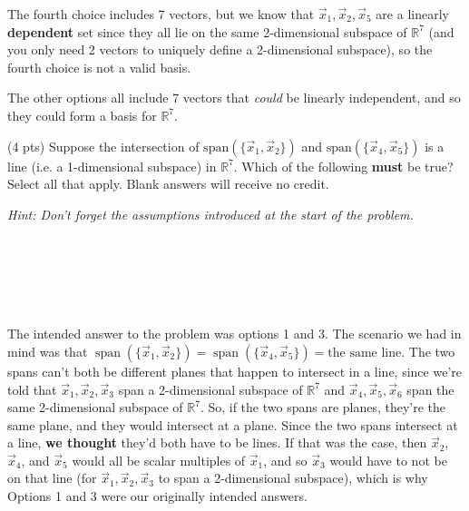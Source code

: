 \documentclass[11pt]{article}
\begin{document}
\begin{prob}
\begin{subprob}
\begin{solution}
The fourth choice includes 7 vectors, but we know that $\vec x_1, \vec x_2, \vec x_5$ are a linearly \textbf{dependent} set since they all lie on the same 2-dimensional subspace of $\mathbb{R}^7$ (and you only need 2 vectors to uniquely define a 2-dimensional subspace), so the fourth choice is not a valid basis.

The other options all include 7 vectors that \textit{could} be linearly independent, and so they could form a basis for $\mathbb{R}^7$.
\end{solution}

\end{subprob}

\begin{subprob}(4 pts) Suppose the intersection of $\text{span}(\{\vec x_1, \vec x_2\})$ and $\text{span}(\{ \vec x_4, \vec x_5 \})$ is a line (i.e. a 1-dimensional subspace) in $\mathbb{R}^{7}$. Which of the following \textbf{must} be true? Select all that apply. Blank answers will receive no credit.

\textit{Hint: Don't forget the assumptions introduced at the start of the problem.} \\ \\
 \\
 \\
 \\
 \\

\begin{solution}
The intended answer to the problem was options 1 and 3. The scenario we had in mind was that $\operatorname{span}(\{\vec x_1, \vec x_2\}) = \operatorname{span}(\{\vec x_4, \vec x_5\}) = \text{the same line}$. The two spans can't both be different planes that happen to intersect in a line, since we're told that $\vec x_1, \vec x_2, \vec x_3$ span a 2-dimensional subspace of $\mathbb{R}^7$ and $\vec x_4, \vec x_5, \vec x_6$ span the same 2-dimensional subspace of $\mathbb{R}^7$. So, if the two spans are planes, they're the same plane, and they would intersect at a plane. Since the two spans intersect at a line, \textbf{we thought} they'd both have to be lines. If that was the case, then $\vec x_2$, $\vec x_4$, and $\vec x_5$ would all be scalar multiples of $\vec x_1$, and so $\vec x_3$ would have to not be on that line (for $\vec x_1, \vec x_2, \vec x_3$ to span a 2-dimensional subspace), which is why Options 1 and 3 were our originally intended answers. \\


\end{solution}
\end{subprob}
\end{prob}
\end{document}
